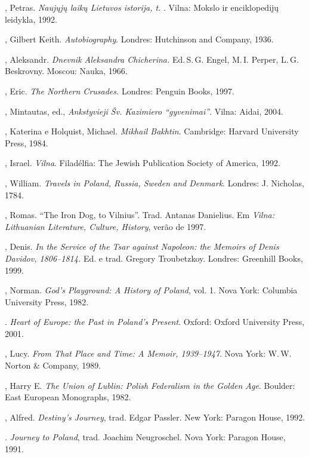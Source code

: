 \begin{bibliohedra}
  , Petras. \textit{Naujųjų laikų Lietuvos istorija, t. }.
  Vilna: Mokslo ir enciklopedijų leidykla, 1992.

  , Gilbert Keith. \textit{Autobiography}. Londres: Hutchinson
  and Company, 1936.

  , Aleksandr. \textit{Dnevnik Aleksandra Chicherina.} Ed.\,S.\,G.
  Engel, M.\,I. Perper, L.\,G. Beskrovny. Moscou: Nauka, 1966.

  , Eric. \textit{The Northern Crusades.} Londres: Penguin
  Books, 1997.

  , Mintautas, ed., \textit{Ankstyvieji Šv. Kazimiero
  ``gyvenimai''}. Vilna: Aidai, 2004.

  , Katerina e Holquist, Michael. \textit{Mikhail Bakhtin}.
  Cambridge: Harvard University Press, 1984.

  , Israel. \textit{Vilna}. Filadélfia: The Jewish Publication
  Society of America, 1992.

  , William. \textit{Travels in Poland, Russia, Sweden and Denmark}.
  Londres: J. Nicholas, 1784.

  , Romas. ``The Iron Dog, to Vilnius''. Trad. Antanas
  Danielius. Em \textit{Vilna: Lithuanian Literature, Culture, History},
  verão de 1997.

  , Denis. \textit{In the Service of the Tsar against Napoleon: the
  Memoirs of Denis Davidov, 1806--1814.} Ed. e trad. Gregory Troubetzkoy.
  Londres: Greenhill Books, 1999.

  , Norman. \textit{God's Playground: A History of Poland}, vol. 1.
  Nova York: Columbia University Press, 1982.

  \titidem. \textit{Heart of Europe: the Past in Poland's Present}.
  Oxford: Oxford University Press, 2001.

  , Lucy. \textit{From That Place and Time: A Memoir,
  1939--1947}. Nova York: W.\,W. Norton \& Company, 1989.

  , Harry E. \textit{The Union of Lublin: Polish Federalism in
  the Golden Age}. Boulder: East European Monographs, 1982.

  , Alfred. \textit{Destiny's Journey}, trad. Edgar Passler. New
  York: Paragon House, 1992.

  \titidem. \textit{Journey to Poland}, trad. Joachim Neugroschel.
  Nova York: Paragon House, 1991.


\end{bibliohedra}
